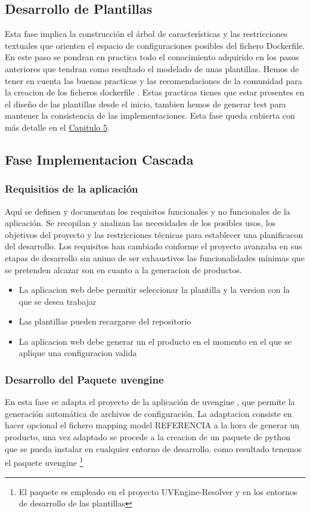 \documentclass[12pt, a4paper, twoside]{article}
\begin{document}
\subsection{Desarrollo de Plantillas}
Esta fase implica la construcción el árbol de características y las restricciones textuales que orienten el espacio de 
configuraciones posibles del fichero Dockerfile. En este paso se pondran en practica todo el conocimiento adquirido en los pasos anteriores que 
tendran como resultado el modelado de unas plantillas. Hemos de tener en cuenta las buenas practicas y las recomendaciones de la comunidad para la creacion de los ficheros dockerfile \cite{dockerfile_concepts}. 
Estas practicas tienes que estar presentes en el diseño de las plantillas desde el inicio, tambien hemos de generar test para mantener la consistencia de las implementaciones. 
Esta fase queda cubierta con más detalle en el \hyperref[sec:Modelado de las plantillas]{Capitulo 5}.


\subsection{Fase Implementacion Cascada}
\subsubsection{Requisitios de la aplicación }
Aquí se definen y documentan los requisitos funcionales y no funcionales de la aplicación. Se recopilan y analizan las 
necesidades de los posibles usos, los objetivos del proyecto y las restricciones técnicas para establecer una planificacon del desarrollo. 
Los requisitos han cambiado conforme el proyecto avanzaba en sus etapas de desarrollo
sin animo de ser exhaustivos las funcionalidades mínimas que se pretenden alcazar son en cuanto a la generacion de productos.
\begin{itemize}
	\item La aplicacion web debe permitir seleccionar la plantilla y la version con la que se desea trabajar 
	\item Las plantillas pueden recargarse del repositorio 
	\item La aplicacion web debe generar un el producto en el momento en el que se aplique una configuracion valida 
\end{itemize}

\subsubsection{Desarrollo del Paquete uvengine }
En esta fase se adapta el proyecto de la aplicación de uvengine \cite{uvengine_github}, que permite la generación automática de archivos de configuración.
La adaptacion consiste en hacer opcional el fichero mapping model REFERENCIA a la hora de generar un producto, una vez adaptado se procede a la creacion de un paquete de python que se pueda instalar en cualquier entorno de desarrollo.
como resultado tenemos el paquete uvengine \cite{uvengine_pypi} \footnote{El paquete es empleado en el proyecto UVEngine-Resolver y en los entornos de desarrollo de las plantillas}
\end{document}
